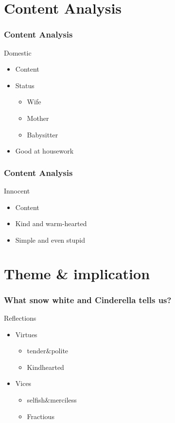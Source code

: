 \documentclass{beamer}
\begin{document}
\section{Content Analysis}

\begin{frame}
    \frametitle{Content Analysis}
    \begin{block}{Domestic}
        \begin{itemize}
            \item Content
            \item Status
                  \begin{itemize}
                      \item Wife
                      \item Mother
                      \item Babysitter
                  \end{itemize}
            \item Good at housework
        \end{itemize}
    \end{block}
\end{frame}

\begin{frame}
    \frametitle{Content Analysis}
    \begin{block}{Innocent}
        \begin{itemize}
            \item Content
            \item Kind and warm-hearted
            \item Simple and even stupid
        \end{itemize}
    \end{block}
\end{frame}

\section{Theme \& implication}
\begin{frame}
    \frametitle{What snow white and Cinderella tells us?}
    \begin{block}{Reflections}
        \begin{itemize}
            \item Virtues
                  \begin{itemize}
                      \item tender$\&$polite
                      \item Kindhearted
                  \end{itemize}
            \item Vices
                  \begin{itemize}
                      \item selfish$\&$merciless
                      \item Fractious
                  \end{itemize}
        \end{itemize}
    \end{block}
\end{frame}
\end{document}
